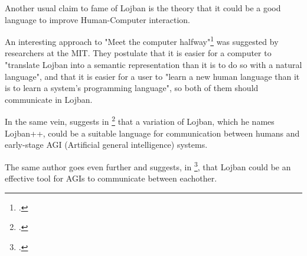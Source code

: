 Another usual claim to fame of Lojban is the theory that it could be a good language to improve Human-Computer interaction.\newline

An interesting approach to "Meet the computer halfway"\footcite{speer2004meeting} was suggested by researchers at the MIT. They postulate that it is easier
for a computer to "translate Lojban into a semantic representation than it is to do so with a natural language", and that it is easier
for a user to "learn a new human language than it is to learn a system's programming language", so both of them should communicate in Lojban.\newline

In the same vein, \citeauthor{goertzel2013lojban} suggests in \footcite{goertzel2013lojban} that a variation of Lojban,
which he names Lojban++, could be a suitable language for communication between humans and early-stage AGI (Artificial general intelligence)
systems.\newline

The same author goes even further and suggests, in \footcite{goertzel2014communication}, that Lojban could be
an effective tool for AGIs to communicate between eachother.